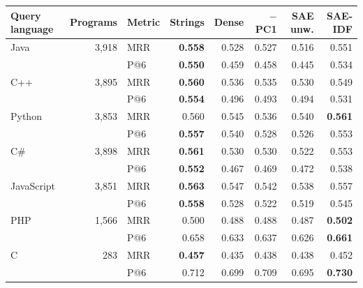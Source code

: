 \begin{tabular}{@{}lrlrrrrr@{}}
\toprule
Query language & Programs & Metric & Strings & Dense & $-$PC1 & SAE unw. & \textbf{SAE-IDF} \\
\midrule
Java & 3,918 & MRR & \textbf{0.558} & 0.528 & 0.527 & 0.516 & 0.551 \\
 &  & P@6 & \textbf{0.550} & 0.459 & 0.458 & 0.445 & 0.534 \\
C++ & 3,895 & MRR & \textbf{0.560} & 0.536 & 0.535 & 0.530 & 0.549 \\
 &  & P@6 & \textbf{0.554} & 0.496 & 0.493 & 0.494 & 0.531 \\
Python & 3,853 & MRR & 0.560 & 0.545 & 0.536 & 0.540 & \textbf{0.561} \\
 &  & P@6 & \textbf{0.557} & 0.540 & 0.528 & 0.526 & 0.553 \\
C\# & 3,898 & MRR & \textbf{0.561} & 0.530 & 0.530 & 0.522 & 0.553 \\
 &  & P@6 & \textbf{0.552} & 0.467 & 0.469 & 0.472 & 0.538 \\
JavaScript & 3,851 & MRR & \textbf{0.563} & 0.547 & 0.542 & 0.538 & 0.557 \\
 &  & P@6 & \textbf{0.558} & 0.528 & 0.522 & 0.519 & 0.545 \\
PHP & 1,566 & MRR & 0.500 & 0.488 & 0.488 & 0.487 & \textbf{0.502} \\
 &  & P@6 & 0.658 & 0.633 & 0.637 & 0.626 & \textbf{0.661} \\
C & 283 & MRR & \textbf{0.457} & 0.435 & 0.438 & 0.438 & 0.452 \\
 &  & P@6 & 0.712 & 0.699 & 0.709 & 0.695 & \textbf{0.730} \\
\bottomrule
\end{tabular}
